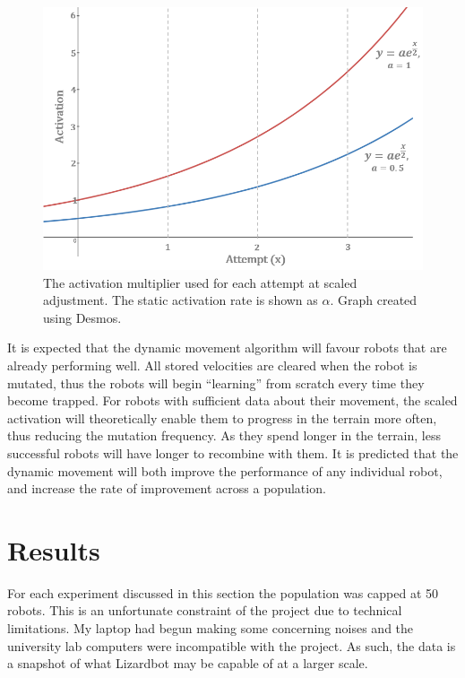 \documentclass{article}
\begin{document}
\begin{enumerate}
\begin{figure}[H]
\centering
\includegraphics[scale=0.8]{activationFunction}
\caption{The activation multiplier used for each attempt at scaled adjustment. The static activation rate is shown as $\alpha$. Graph created using Desmos. \citep{graphs}}
\end{figure}
\end{enumerate}

It is expected that the dynamic movement algorithm will favour robots that are already performing well. All stored velocities are cleared when the robot is mutated, thus the robots will begin “learning” from scratch every time they become trapped. For robots with sufficient data about their movement, the scaled activation will theoretically enable them to progress in the terrain more often, thus reducing the mutation frequency. As they spend longer in the terrain, less successful robots will have longer to recombine with them. It is predicted that the dynamic movement will both improve the performance of any individual robot, and increase the rate of improvement across a population. \\

\newpage
\section{Results}
\label{sec:Results}
For each experiment discussed in this section the population was capped at 50 robots. This is an unfortunate constraint of the project due to technical limitations. My laptop had begun making some concerning noises and the university lab computers were incompatible with the project. As such, the data is a snapshot of what Lizardbot may be capable of at a larger scale.\\
\end{document}
